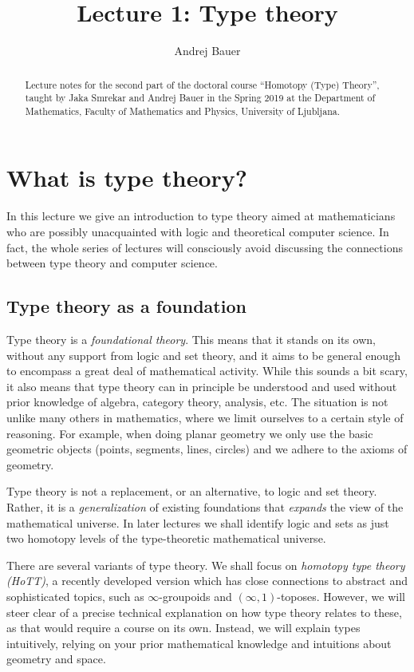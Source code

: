 \documentclass{amsart}
\begin{document}
\title{Lecture 1: Type theory}
\author{Andrej Bauer}
\maketitle

\begin{abstract}
  Lecture notes for the second part of the doctoral course ``Homotopy (Type)
  Theory'', taught by Jaka Smrekar and Andrej Bauer in the Spring 2019 at the
  Department of Mathematics, Faculty of Mathematics and Physics, University of
  Ljubljana.
\end{abstract}


\section{What is type theory?}
\label{sec:what-type-theory}

In this lecture we give an introduction to type theory aimed at mathematicians
who are possibly unacquainted with logic and theoretical computer science. In
fact, the whole series of lectures will consciously avoid discussing the
connections between type theory and computer science.

\subsection{Type theory as a foundation}

Type theory is a \emph{foundational theory}. This means that it stands on its
own, without any support from logic and set theory, and it aims to be general
enough to encompass a great deal of mathematical activity. While this sounds a
bit scary, it also means that type theory can in principle be understood and
used without prior knowledge of algebra, category theory, analysis, etc. The
situation is not unlike many others in mathematics, where we limit ourselves to
a certain style of reasoning. For example, when doing planar geometry we only
use the basic geometric objects (points, segments, lines, circles) and we adhere
to the axioms of geometry.

Type theory is not a replacement, or an alternative, to logic and set theory.
Rather, it is a \emph{generalization} of existing foundations that
\emph{expands} the view of the mathematical universe. In later lectures we shall
identify logic and sets as just two homotopy levels of the type-theoretic
mathematical universe.

There are several variants of type theory. We shall focus on \emph{homotopy type
  theory (HoTT)}, a recently developed version which has close connections to
abstract and sophisticated topics, such as $\infty$-groupoids and
$(\infty,1)$-toposes. However, we will steer clear of a precise technical
explanation on how type theory relates to these, as that would require a course
on its own. Instead, we will explain types intuitively, relying on your prior
mathematical knowledge and intuitions about geometry and space.
\end{document}
